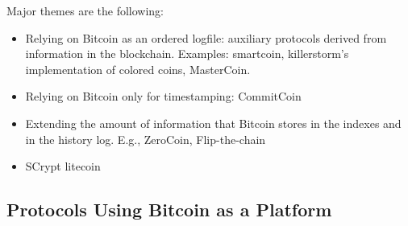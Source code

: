 Major themes are the following:
\begin{itemize}
\item Relying on Bitcoin as an ordered logfile: auxiliary protocols derived from information in the blockchain. Examples: smartcoin, killerstorm's implementation of colored coins, MasterCoin.
\item Relying on Bitcoin only for timestamping: CommitCoin
\item Extending the amount of information that Bitcoin stores in the indexes and in the history log. E.g., ZeroCoin, Flip-the-chain
\item SCrypt litecoin
\end{itemize}



\cite{miller2001capability}
\cite{szabo1997formalizing,bitcointalk-bondmarkets}

\subsection{Protocols Using Bitcoin as a Platform}

